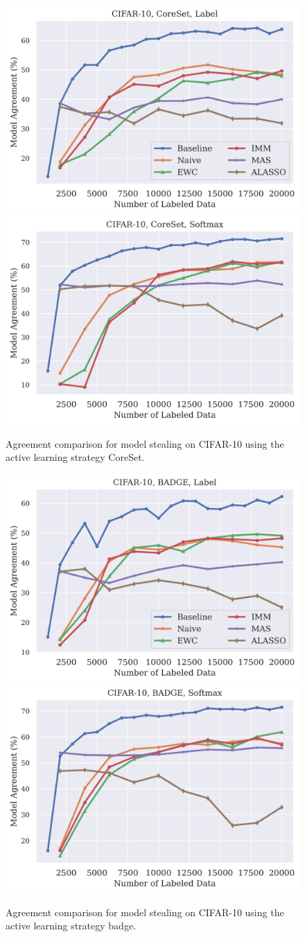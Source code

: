 \begin{figure}[!htb]
    \centering
    \includegraphics[width=0.48\linewidth]{images/results_CALMS/cifar_label_coreset.png} \hfill
    \includegraphics[width=0.48\linewidth]{images/results_CALMS/cifar_softmax_coreset.png}
    \caption{Agreement comparison for model stealing on CIFAR-10 using the active learning strategy CoreSet.}
    \label{fig:CALMSCIFAR10CoreSet}
\end{figure}

\begin{figure}[!htb]
    \centering
    \includegraphics[width=0.48\linewidth]{images/results_CALMS/cifar_label_badge.png} \hfill
    \includegraphics[width=0.48\linewidth]{images/results_CALMS/cifar_softmax_badge.png}
    \caption{Agreement comparison for model stealing on CIFAR-10 using the active learning strategy \gls{badge}.}
    \label{fig:CALMSCIFAR10Badge}
\end{figure}

